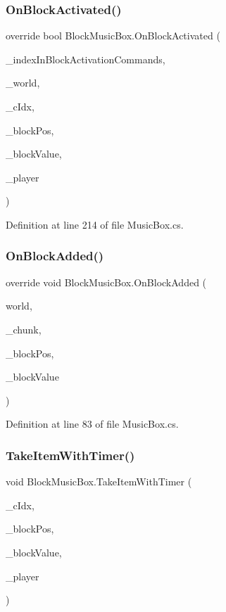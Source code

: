 \subsubsection{\texorpdfstring{OnBlockActivated()}{OnBlockActivated()}}
{\footnotesize\ttfamily override bool Block\+Music\+Box.\+On\+Block\+Activated (\begin{DoxyParamCaption}\item[{int}]{\+\_\+index\+In\+Block\+Activation\+Commands,  }\item[{World\+Base}]{\+\_\+world,  }\item[{int}]{\+\_\+c\+Idx,  }\item[{Vector3i}]{\+\_\+block\+Pos,  }\item[{Block\+Value}]{\+\_\+block\+Value,  }\item[{Entity\+Alive}]{\+\_\+player }\end{DoxyParamCaption})}



Definition at line 214 of file Music\+Box.\+cs.

\mbox{\label{class_block_music_box_a219b49bc87eaaf1273ebb4159ed37b2a}} 
\subsubsection{\texorpdfstring{OnBlockAdded()}{OnBlockAdded()}}
{\footnotesize\ttfamily override void Block\+Music\+Box.\+On\+Block\+Added (\begin{DoxyParamCaption}\item[{World\+Base}]{world,  }\item[{Chunk}]{\+\_\+chunk,  }\item[{Vector3i}]{\+\_\+block\+Pos,  }\item[{Block\+Value}]{\+\_\+block\+Value }\end{DoxyParamCaption})}



Definition at line 83 of file Music\+Box.\+cs.

\mbox{\label{class_block_music_box_ad6371ea130708e5b9ca3cdc1f8ec5206}} 
\subsubsection{\texorpdfstring{TakeItemWithTimer()}{TakeItemWithTimer()}}
{\footnotesize\ttfamily void Block\+Music\+Box.\+Take\+Item\+With\+Timer (\begin{DoxyParamCaption}\item[{int}]{\+\_\+c\+Idx,  }\item[{Vector3i}]{\+\_\+block\+Pos,  }\item[{Block\+Value}]{\+\_\+block\+Value,  }\item[{Entity\+Alive}]{\+\_\+player }\end{DoxyParamCaption})}



